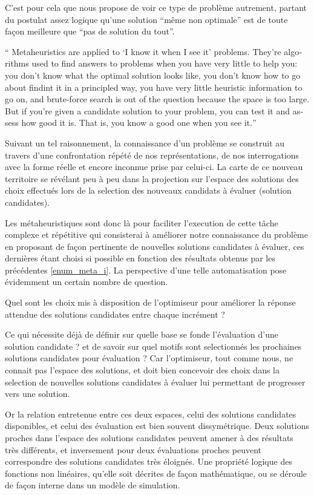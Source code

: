 C'est pour cela que \textcite[7]{Luke2013} nous propose de voir ce type de problème autrement, partant du postulat assez logique qu'une solution \enquote{même non optimale} est de toute façon meilleure que \enquote{pas de solution du tout}.

\foreignquote{english}{ Metaheuristics are applied to \enquote{I know it when I see it} problems. They're algorithms used to find answers to problems when you have very little to help you: you don't know what the optimal solution looks like, you don't know how to go about findint it in a principled way, you have very little heuristic information to go on, and brute-force search is out of the question because the space is too large. But if you're given a candidate solution to your problem, you can test it and assess how good it is. That is, you know a good one when you see it.}  

Suivant un tel raisonnement, la connaissance d'un problème se construit au travers d'une confrontation répété de nos représentations, de nos interrogations avec la forme réelle et encore inconnue prise par celui-ci. La carte de ce nouveau territoire se révélant peu à peu dans la projection sur l'espace des solutions des choix effectués lors de la selection des nouveaux candidats à évaluer (solution candidates).

Les métaheuristiques sont donc là pour faciliter l'execution de cette tâche complexe et répétitive qui consisterai à améliorer notre connaissance du problème en proposant de façon pertinente de nouvelles solutions candidates à évaluer, ces dernières étant choisi si possible en fonction des résultats obtenus par les précédentes \ref{enum_meta_i}. La perspective d'une telle automatisation pose évidemment un certain nombre de question. 

Quel sont les choix mis à disposition de l'optimiseur pour améliorer la réponse attendue des solutions candidates entre chaque incrément ? 

Ce qui nécessite déjà de définir sur quelle base se fonde l'évaluation d'une solution candidate ? et de savoir sur quel motifs sont selectionnés les prochaines solutions candidates pour évaluation ? Car l'optimiseur, tout comme nous, ne connait pas l'espace des solutions, et doit bien concevoir des choix dans la selection de nouvelles solutions candidates à évaluer lui permettant de progresser vers une solution. 

Or la relation entretenue entre ces deux espaces, celui des solutions candidates disponibles, et celui des évaluation est bien souvent dissymétrique. Deux solutions proches dans l'espace des solutions candidates peuvent amener à des résultats très différents, et inversement pour deux évaluations proches peuvent correspondre des solutions candidates très éloignés. Une propriété logique des fonctions non linéaires, qu'elle soit décrites de façon mathématique, ou se déroule de façon interne dans un modèle de simulation.


